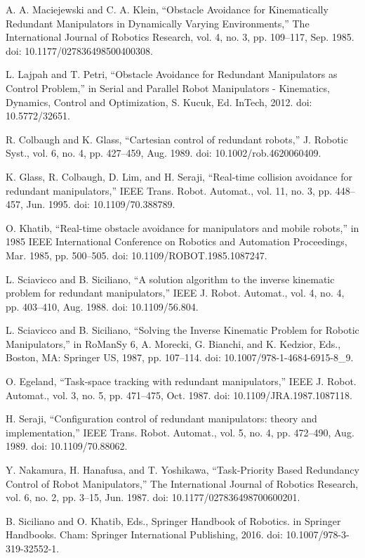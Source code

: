 \documentclass[letterpaper, 10 pt, conference]{ieeeconf}  %
\begin{document}
\begin{thebibliography}{99}
 A. A. Maciejewski and C. A. Klein, “Obstacle Avoidance for Kinematically Redundant Manipulators in Dynamically Varying Environments,” The International Journal of Robotics Research, vol. 4, no. 3, pp. 109–117, Sep. 1985. doi: 10.1177/027836498500400308.

 L. Lajpah and T. Petri, “Obstacle Avoidance for Redundant Manipulators as Control Problem,” in Serial and Parallel Robot Manipulators - Kinematics, Dynamics, Control and Optimization, S. Kucuk, Ed. InTech, 2012. doi: 10.5772/32651.

 R. Colbaugh and K. Glass, “Cartesian control of redundant robots,” J. Robotic Syst., vol. 6, no. 4, pp. 427–459, Aug. 1989. doi: 10.1002/rob.4620060409.

 K. Glass, R. Colbaugh, D. Lim, and H. Seraji, “Real-time collision avoidance for redundant manipulators,” IEEE Trans. Robot. Automat., vol. 11, no. 3, pp. 448–457, Jun. 1995. doi: 10.1109/70.388789.

 O. Khatib, “Real-time obstacle avoidance for manipulators and mobile robots,” in 1985 IEEE International Conference on Robotics and Automation Proceedings, Mar. 1985, pp. 500–505. doi: 10.1109/ROBOT.1985.1087247.

 L. Sciavicco and B. Siciliano, “A solution algorithm to the inverse kinematic problem for redundant manipulators,” IEEE J. Robot. Automat., vol. 4, no. 4, pp. 403–410, Aug. 1988. doi: 10.1109/56.804.

 L. Sciavicco and B. Siciliano, “Solving the Inverse Kinematic Problem for Robotic Manipulators,” in RoManSy 6, A. Morecki, G. Bianchi, and K. Kedzior, Eds., Boston, MA: Springer US, 1987, pp. 107–114. doi: 10.1007/978-1-4684-6915-8\_9.

 O. Egeland, “Task-space tracking with redundant manipulators,” IEEE J. Robot. Automat., vol. 3, no. 5, pp. 471–475, Oct. 1987. doi: 10.1109/JRA.1987.1087118.

 H. Seraji, “Configuration control of redundant manipulators: theory and implementation,” IEEE Trans. Robot. Automat., vol. 5, no. 4, pp. 472–490, Aug. 1989. doi: 10.1109/70.88062.

 Y. Nakamura, H. Hanafusa, and T. Yoshikawa, “Task-Priority Based Redundancy Control of Robot Manipulators,” The International Journal of Robotics Research, vol. 6, no. 2, pp. 3–15, Jun. 1987. doi: 10.1177/027836498700600201.

 B. Siciliano and O. Khatib, Eds., Springer Handbook of Robotics. in Springer Handbooks. Cham: Springer International Publishing, 2016. doi: 10.1007/978-3-319-32552-1.


\end{thebibliography}
\end{document}
